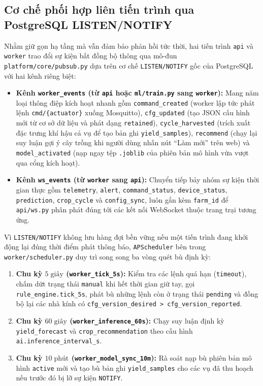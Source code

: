 \subsection{Cơ chế phối hợp liên tiến trình qua PostgreSQL LISTEN/NOTIFY}
\label{subsec:c3-ipc}

Nhằm giữ gọn hạ tầng mà vẫn đảm bảo phản hồi tức thời, hai tiến trình \texttt{api} và \texttt{worker} trao đổi sự kiện bất đồng bộ thông qua mô-đun \texttt{platform/core/pubsub.py} dựa trên cơ chế \texttt{LISTEN/NOTIFY} gốc của PostgreSQL với hai kênh riêng biệt:

\begin{itemize}[leftmargin=*]
    \item \textbf{Kênh \texttt{worker\_events} (từ \texttt{api} hoặc \texttt{ml/train.py} sang \texttt{worker}):} Mang năm loại thông điệp kích hoạt nhanh gồm \texttt{command\_created} (worker lập tức phát lệnh \texttt{cmd/\{actuator\}} xuống Mosquitto), \texttt{cfg\_updated} (tạo JSON cấu hình mới từ cơ sở dữ liệu và phát dạng \texttt{retained}), \texttt{cycle\_harvested} (trích xuất đặc trưng khí hậu cả vụ để tạo bản ghi \texttt{yield\_samples}), \texttt{recommend} (chạy lại suy luận gợi ý cây trồng khi người dùng nhấn nút ``Làm mới'' trên web) và \texttt{model\_activated} (nạp ngay tệp \texttt{.joblib} của phiên bản mô hình vừa vượt qua cổng kích hoạt).
    \item \textbf{Kênh \texttt{ws\_events} (từ \texttt{worker} sang \texttt{api}):} Chuyển tiếp bảy nhóm sự kiện thời gian thực gồm \texttt{telemetry}, \texttt{alert}, \texttt{command\_status}, \texttt{device\_status}, \texttt{prediction}, \texttt{crop\_cycle} và \texttt{config\_sync}, luôn gắn kèm \texttt{farm\_id} để \texttt{api/ws.py} phân phát đúng tới các kết nối WebSocket thuộc trang trại tương ứng.
\end{itemize}

Vì \texttt{LISTEN/NOTIFY} không lưu hàng đợi bền vững nếu một tiến trình đang khởi động lại đúng thời điểm phát thông báo, \texttt{APScheduler} bên trong \texttt{worker/scheduler.py} duy trì song song ba vòng quét bù định kỳ:
\begin{enumerate}[leftmargin=*]
    \item \textbf{Chu kỳ \(5\;\text{giây}\) (\texttt{worker\_tick\_5s}):} Kiểm tra các lệnh quá hạn (\texttt{timeout}), chấm dứt trạng thái \texttt{manual} khi hết thời gian giữ tay, gọi \texttt{rule\_engine.tick\_5s}, phát bù những lệnh còn ở trạng thái \texttt{pending} và đồng bộ lại các nhà kính có \texttt{cfg\_version\_desired > cfg\_version\_reported}.
    \item \textbf{Chu kỳ \(60\;\text{giây}\) (\texttt{worker\_inference\_60s}):} Chạy suy luận định kỳ \texttt{yield\_forecast} và \texttt{crop\_recommendation} theo cấu hình \texttt{ai.inference\_interval\_s}.
    \item \textbf{Chu kỳ \(10\;\text{phút}\) (\texttt{worker\_model\_sync\_10m}):} Rà soát nạp bù phiên bản mô hình \texttt{active} mới và tạo bù bản ghi \texttt{yield\_samples} cho các vụ đã thu hoạch nếu trước đó bị lỡ sự kiện \texttt{NOTIFY}.
\end{enumerate}

